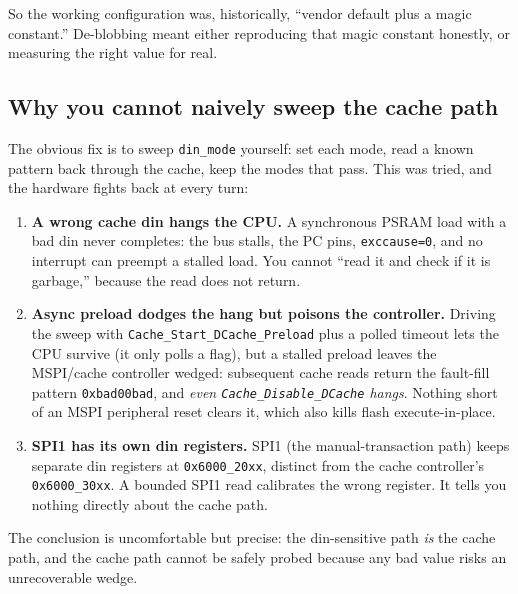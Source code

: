 
So the working configuration was, historically, ``vendor default plus a magic
constant.'' De-blobbing meant either reproducing that magic constant honestly, or
measuring the right value for real.

\subsection{Why you cannot naively sweep the cache path}

The obvious fix is to sweep \texttt{din\_mode} yourself: set each mode, read a known
pattern back through the cache, keep the modes that pass. This was tried, and the
hardware fights back at every turn:

\begin{enumerate}
\item \textbf{A wrong cache din hangs the CPU.} A synchronous PSRAM load with a bad
din never completes: the bus stalls, the PC pins, \texttt{exccause=0}, and no
interrupt can preempt a stalled load. You cannot ``read it and check if it is
garbage,'' because the read does not return.
\item \textbf{Async preload dodges the hang but poisons the controller.} Driving the
sweep with \texttt{Cache\_Start\_DCache\_Preload} plus a polled timeout lets the CPU
survive (it only polls a flag), but a stalled preload leaves the MSPI/cache
controller wedged: subsequent cache reads return the fault-fill pattern
\texttt{0xbad00bad}, and \emph{even \texttt{Cache\_Disable\_DCache} hangs}. Nothing
short of an MSPI peripheral reset clears it, which also kills flash execute-in-place.
\item \textbf{SPI1 has its own din registers.} SPI1 (the manual-transaction path) keeps
separate din registers at \texttt{0x6000\_20xx}, distinct from the cache controller's
\texttt{0x6000\_30xx}. A bounded SPI1 read calibrates the wrong register. It tells
you nothing directly about the cache path.
\end{enumerate}

The conclusion is uncomfortable but precise: the din-sensitive path \emph{is} the
cache path, and the cache path cannot be safely probed because any bad value risks an
unrecoverable wedge.

